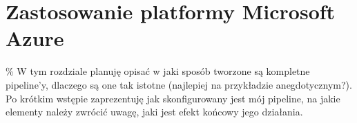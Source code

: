 \section{Zastosowanie platformy Microsoft Azure}


\% W tym rozdziale planuję opisać w jaki sposób tworzone są kompletne pipeline'y, 
dlaczego są one tak istotne (najlepiej na przykładzie anegdotycznym?).
Po krótkim wstępie zaprezentuję jak skonfigurowany jest mój pipeline,
na jakie elementy należy zwrócić uwagę, jaki jest efekt końcowy jego działania.